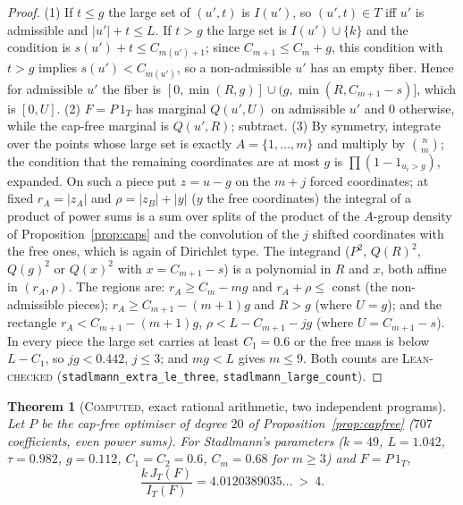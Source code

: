 \documentclass[11pt]{amsart}
\newtheorem{theorem}{Theorem}
\theoremstyle{definition}
\theoremstyle{remark}
\newcommand{\lbl}[1]{\textup{\textsc{#1}}}
\begin{document}
\begin{proof}
(1) If $t\le g$ the large set of $(u',t)$ is $I(u')$, so $(u',t)\in T$ iff
$u'$ is admissible and $|u'|+t\le L$. If $t>g$ the large set is
$I(u')\cup\{k\}$ and the condition is $s(u')+t\le C_{m(u')+1}$; since
$C_{m+1}\le C_m+g$, this condition with $t>g$ implies
$s(u')<C_{m(u')}$, so a non-admissible $u'$ has an empty fiber. Hence for
admissible $u'$ the fiber is $[0,\min(R,g)]\cup(g,\min(R,C_{m+1}-s)]$, which
is $[0,U]$. (2) $F=P\,1_T$ has marginal $Q(u',U)$ on admissible $u'$ and $0$
otherwise, while the cap-free marginal is $Q(u',R)$; subtract. (3) By symmetry,
integrate over the points whose large set is exactly $A=\{1,\dots,m\}$ and
multiply by $\binom nm$; the condition that the remaining coordinates are at
most $g$ is $\prod(1-1_{u_i>g})$, expanded. On such a piece put $z=u-g$ on the
$m+j$ forced coordinates; at fixed $r_A=|z_A|$ and $\rho=|z_B|+|y|$ ($y$ the
free coordinates) the integral of a product of power sums is a sum over splits
of the product of the $A$-group density of Proposition~\ref{prop:caps} and the
convolution of the $j$ shifted coordinates with the free ones, which is again
of Dirichlet type. The integrand ($P^2$, $Q(R)^2$, $Q(g)^2$ or $Q(x)^2$ with
$x=C_{m+1}-s$) is a polynomial in $R$ and $x$, both affine in
$(r_A,\rho)$. The regions are: $r_A\ge C_m-mg$ and $r_A+\rho\le$ const
(the non-admissible pieces); $r_A\ge C_{m+1}-(m+1)g$ and $R>g$ (where $U=g$);
and the rectangle $r_A<C_{m+1}-(m+1)g$, $\rho<L-C_{m+1}-jg$ (where
$U=C_{m+1}-s$). In every piece the large set carries at least $C_1=0.6$ or
the free mass is below $L-C_1$, so $jg<0.442$, $j\le3$; and $mg<L$ gives
$m\le9$. Both counts are \lbl{Lean-checked}
(\texttt{stadlmann\_extra\_le\_three}, \texttt{stadlmann\_large\_count}).
\end{proof}

\begin{theorem}[\lbl{Computed}, exact rational arithmetic, two independent programs]\label{thm:capped-exact}
Let $P$ be the cap-free optimiser of degree $20$ of
Proposition~\ref{prop:capfree} ($707$ coefficients, even power sums). For
Stadlmann's parameters ($k=49$, $L=1.042$, $\tau=0.982$, $g=0.112$,
$C_1=C_2=0.6$, $C_m=0.68$ for $m\ge3$) and $F=P\,1_T$,
\[
\frac{k\,J_T(F)}{I_T(F)}=4.0120389035\ldots\ >\ 4 .
\]
\end{theorem}
\end{document}
